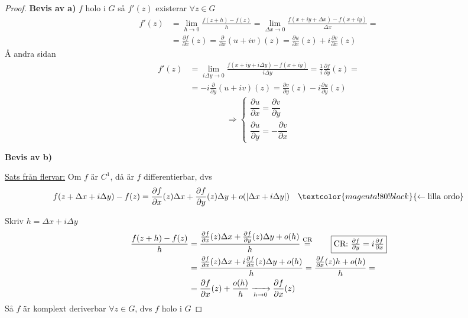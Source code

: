 \begin{proof}
\textbf{Bevis av a)} $f$ holo i $G$ så $f'(z)$ existerar $\forall z \in G$
\begin{align*}
f'(z) &= \lim_{h \to 0} \frac{f(z + h) - f(z)}{h} = \lim_{\Delta x \to 0} \frac{f(x + iy + \Delta x) - f(x + iy)}{\Delta x} = \\
&= \frac{\partial f}{\partial x}(z) = \frac{\partial}{\partial x}(u + iv)(z) = \frac{\partial u}{\partial x}(z) + i\frac{\partial v}{\partial x}(z)
\end{align*}
Å andra sidan
\begin{align*}
f'(z) &= \lim_{i\Delta y \to 0} \frac{f(x + iy + i\Delta y) - f(x + iy)}{i\Delta y} = \frac{1}{i}\frac{\partial f}{\partial y}(z) = \\
&= -i\frac{\partial}{\partial y}(u + iv)(z) = \frac{\partial v}{\partial y}(z) - i\frac{\partial u}{\partial y}(z)
\end{align*}
\[ \Rightarrow \begin{cases} \dfrac{\partial u}{\partial x} = \dfrac{\partial v}{\partial y} \\[1em] \dfrac{\partial u}{\partial y} = -\dfrac{\partial v}{\partial x} \end{cases} \]

\textbf{Bevis av b)}
\begin{framed}
\underline{Sats från flervar:} Om $f$ är $C^1$, då är $f$ differentierbar, dvs
\[ f(z + \Delta x + i\Delta y) - f(z) = \frac{\partial f}{\partial x}(z)\Delta x + \frac{\partial f}{\partial y}(z)\Delta y + o(|\Delta x + i\Delta y|) \quad \textcolor{magenta!80!black}{\leftarrow \text{lilla ordo}} \]
\end{framed}
Skriv $h = \Delta x + i\Delta y$
\begin{align*}
\frac{f(z + h) - f(z)}{h} &= \frac{\frac{\partial f}{\partial x}(z)\Delta x + \frac{\partial f}{\partial y}(z)\Delta y + o(h)}{h} \overset{\text{CR}}{=} \qquad \fbox{$\text{CR: } \frac{\partial f}{\partial y} = i\frac{\partial f}{\partial x}$} \\
&= \frac{\frac{\partial f}{\partial x}(z)\Delta x + i\frac{\partial f}{\partial x}(z)\Delta y + o(h)}{h} = \frac{\frac{\partial f}{\partial x}(z)h + o(h)}{h} = \\
&= \frac{\partial f}{\partial x}(z) + \frac{o(h)}{h} \xrightarrow[h \to 0]{} \frac{\partial f}{\partial x}(z)
\end{align*}
Så $f$ är komplext deriverbar $\forall z \in G$, dvs $f$ holo i $G$
\end{proof}

